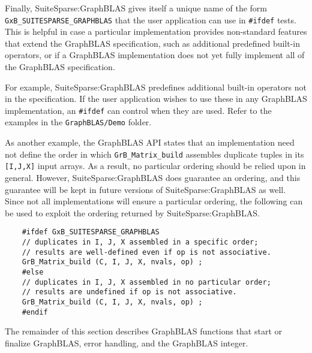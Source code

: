 \documentclass[12pt]{article}
\begin{document}
Finally, SuiteSparse:GraphBLAS gives itself a unique name of the form
\verb'GxB_SUITESPARSE_GRAPHBLAS' that the user application can use in
\verb'#ifdef' tests. This is helpful in case a particular implementation
provides non-standard features that extend the GraphBLAS specification, such as
additional predefined built-in operators, or if a GraphBLAS implementation does
not yet fully implement all of the GraphBLAS specification. 

For example, SuiteSparse:GraphBLAS predefines additional built-in operators not
in the specification.  If the user application wishes to use these in any
GraphBLAS implementation, an \verb'#ifdef' can control when they are used.
Refer to the examples in the \verb'GraphBLAS/Demo' folder.

As another example, the GraphBLAS API states that an
implementation need not define the order in which \verb'GrB_Matrix_build'
assembles duplicate tuples in its \verb'[I,J,X]' input arrays.  As a result, no
particular ordering should be relied upon in general.  However,
SuiteSparse:GraphBLAS does guarantee an ordering, and this guarantee will be
kept in future versions of SuiteSparse:GraphBLAS as well.  Since not all
implementations will ensure a particular ordering, the following can be used to
exploit the ordering returned by SuiteSparse:GraphBLAS.

    {\footnotesize
    \begin{verbatim}
    #ifdef GxB_SUITESPARSE_GRAPHBLAS
    // duplicates in I, J, X assembled in a specific order;
    // results are well-defined even if op is not associative.
    GrB_Matrix_build (C, I, J, X, nvals, op) ;
    #else
    // duplicates in I, J, X assembled in no particular order;
    // results are undefined if op is not associative.
    GrB_Matrix_build (C, I, J, X, nvals, op) ;
    #endif \end{verbatim}}

The remainder of this section describes GraphBLAS functions that start or finalize GraphBLAS,
error handling, and the GraphBLAS integer.
\end{document}
